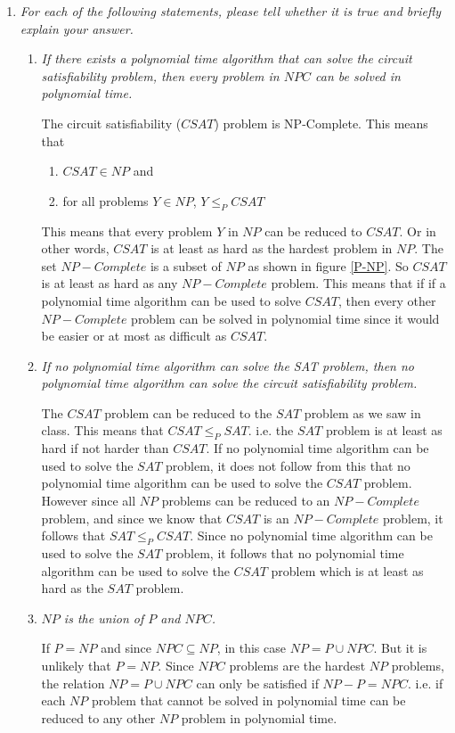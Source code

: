\documentclass[paper=a4, fontsize=11pt]{scrartcl} %
\numberwithin{equation}{section} %
\numberwithin{figure}{section} %
\numberwithin{table}{section} %
\begin{document}
\begin{enumerate}
  \item \textit{For each of the following statements, please tell whether it is true and briefly explain your answer.}
  \begin{enumerate}
    \item \textit{If there exists a polynomial time algorithm that can solve the circuit satisfiability problem, then every problem in $NPC$ can be solved in polynomial time.}
    
The circuit satisfiability ($CSAT$) problem is NP-Complete. This means that
\begin{enumerate}
\item $CSAT \in NP$ and
\item for all problems $Y \in NP$, $Y \leq_P CSAT$ 
\end{enumerate}
This means that every problem $Y$ in $NP$ can be reduced to $CSAT$. Or in other words, $CSAT$ is at least as hard as the hardest problem in $NP$. The set $NP-Complete$ is a subset of $NP$ as shown in figure \ref{P-NP}. So $CSAT$ is at least as hard as any $NP-Complete$ problem. This means that if if a polynomial time algorithm can be used to solve $CSAT$, then every other $NP-Complete$ problem can be solved in polynomial time since it would be easier or at most as difficult as $CSAT$.

    \item \textit{If no polynomial time algorithm can solve the SAT problem, then no polynomial time algorithm can solve the circuit satisfiability problem.}
    
    The $CSAT$ problem can be reduced to the $SAT$ problem as we saw in class. This means that $CSAT \leq_P SAT$. i.e. the $SAT$ problem is at least as hard if not harder than $CSAT$. If no polynomial time algorithm can be used to solve the $SAT$ problem, it does not follow from this that no polynomial time algorithm can be used to solve the $CSAT$ problem. However since all $NP$ problems can be reduced to an $NP-Complete$ problem, and since we know that $CSAT$ is an $NP-Complete$ problem, it follows that $SAT \leq_P CSAT$. Since no polynomial time algorithm can be used to solve the $SAT$ problem, it follows that no polynomial time algorithm can be used to solve the $CSAT$ problem which is at least as hard as the $SAT$ problem.
    
    \item \textit{$NP$ is the union of $P$ and $NPC$.}
    
    If $P=NP$ and since $NPC \subseteq NP$, in this case $NP = P \cup NPC$. But it is unlikely that $P=NP$. Since $NPC$ problems are the hardest $NP$ problems, the relation $NP = P \cup NPC$ can only be satisfied if $NP - P = NPC$. i.e. if each $NP$ problem that cannot be solved in polynomial time can be reduced to any other $NP$ problem in polynomial time.
    

\end{enumerate}
\end{enumerate}
\end{document}
